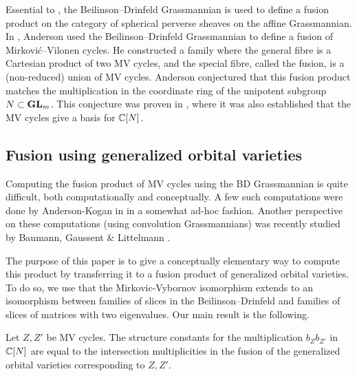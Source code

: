 \documentclass[draft]{article} %
\begin{document}
Essential to \cite{mirkovic2007geometric}, the Beilinson--Drinfeld Grassmannian is used to define a fusion product on the category of spherical perverse sheaves on the affine Grassmannian.  In \cite{anderson2003polytope}, Anderson used the Beilinson--Drinfeld Grassmannian to define a fusion of Mirkovi\'c--Vilonen cycles.  He constructed a family where the general fibre is a Cartesian product of two MV cycles, and the special fibre, called the fusion, is a (non-reduced) union of MV cycles.  Anderson conjectured that this fusion product matches the multiplication in the coordinate ring of the unipotent subgroup $ N \subset{\mathbf{GL}}_m$.  This conjecture was proven in \cite{baumann2019mirkovic}, where it was also established that the MV cycles give a basis for $ \mathbb C[N]$.
% 
%


\subsection{Fusion using generalized orbital varieties}
Computing the fusion product of MV cycles using the BD Grassmannian is quite difficult, both computationally and conceptually.  A few such computations were done by Anderson-Kogan in \cite{anderson2006algebra} in a somewhat ad-hoc fashion.  Another perspective on these computations (using convolution Grassmannians) was recently studied by Baumann, Gaussent \& Littelmann \cite{baumann2020bases}.

The purpose of this paper is to give a conceptually elementary way to compute this product by transferring it to a fusion product of generalized orbital varieties.  To do so, we use that the Mirkovic-Vybornov isomorphism extends to an isomorphism between families of slices in the Beilinson--Drinfeld and families of slices of matrices with two eigenvalues. Our main result is the following.

\begin{theorem}
    Let $ Z, Z' $ be MV cycles.  The structure constants for the multiplication $ b_Z b_{Z'}$ in $\mathbb C[N]$ are equal to the intersection multiplicities in the fusion of the generalized orbital varieties corresponding to $ Z, Z'$.
\end{theorem}
% 
\end{document}

